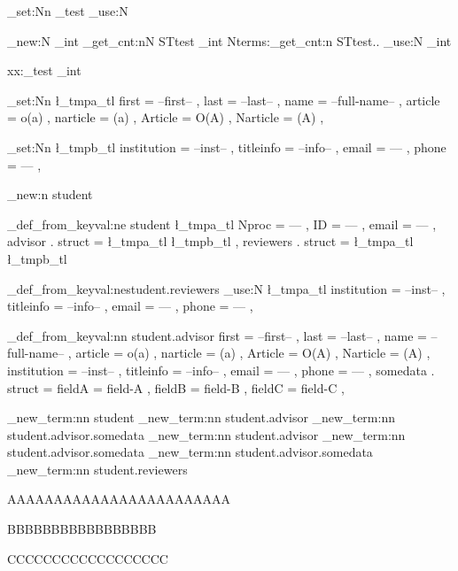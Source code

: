 \documentclass{article}
\begin{document}
\tl_set:Nn \tl_test \int_use:N

\int_new:N \my_int
\starray_get_cnt:nN {STtest} \my_int
Nterms:\starray_get_cnt:n {STtest}.. \int_use:N \my_int\par

xx:\tl_test \my_int \par
        \tl_set:Nn \l_tmpa_tl {
          first = --first-- ,
          last = --last-- ,
          name = --full-name-- ,
          article = o(a) ,
          narticle = (a) ,
          Article = O(A) ,
          Narticle = (A) ,
        }

        \tl_set:Nn \l_tmpb_tl {
          institution = --inst-- ,
          titleinfo = --info-- ,
          email = --- ,
          phone = --- ,
        }

        \starray_new:n {student}



        \starray_def_from_keyval:ne {student}
        {
          \l_tmpa_tl
          Nproc = --- ,
          ID = --- ,
          email = --- ,
          advisor . struct = {
            \l_tmpa_tl
            \l_tmpb_tl
          } ,
          reviewers . struct = {
            \l_tmpa_tl
            \l_tmpb_tl
          }
        }

        \starray_def_from_keyval:ne{student.reviewers}
        {
          \tl_use:N \l_tmpa_tl
          institution = --inst-- ,
          titleinfo = --info-- ,
          email = --- ,
          phone = --- ,
        }

        \starray_def_from_keyval:nn {student.advisor}
        {
          first = --first-- ,
          last = --last-- ,
          name = --full-name-- ,
          article = o(a) ,
          narticle = (a) ,
          Article = O(A) ,
          Narticle = (A) ,
          institution = --inst-- ,
          titleinfo = --info-- ,
          email = --- ,
          phone = --- ,
          somedata . struct = {
            fieldA = field-A ,
            fieldB = field-B ,
            fieldC = field-C ,
          }
        }


        \starray_new_term:nn {student}{}
        \starray_new_term:nn {student.advisor}{}
        \starray_new_term:nn {student.advisor.somedata}{}
        \starray_new_term:nn {student.advisor}{}
        \starray_new_term:nn {student.advisor.somedata}{}
        \starray_new_term:nn {student.advisor.somedata}{}
        \starray_new_term:nn {student.reviewers}{}


\par AAAAAAAAAAAAAAAAAAAAAAAA \par BBBBBBBBBBBBBBBBB \par CCCCCCCCCCCCCCCCCC \par
\end{document}
